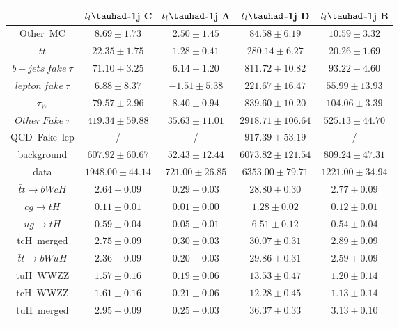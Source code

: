 \centering
\begin{tabular}{ccccc} \toprule\toprule
 & $t_{l}\tauhad$-1j C & $t_{l}\tauhad$-1j A & $t_{l}\tauhad$-1j D & $t_{l}\tauhad$-1j B\\\midrule
Other~MC & $8.69\pm1.73$ & $2.50\pm1.45$ & $84.58\pm6.19$ & $10.59\pm3.32$\\
$t\bar{t}$ & $22.35\pm1.75$ & $1.28\pm0.41$ & $280.14\pm6.27$ & $20.26\pm1.69$\\
$b-jets~fake~\tau$ & $71.10\pm3.25$ & $6.14\pm1.20$ & $811.72\pm10.82$ & $93.22\pm4.60$\\
$lepton~fake~\tau$ & $6.88\pm8.37$ & $-1.51\pm5.38$ & $221.67\pm16.47$ & $55.99\pm13.93$\\
$\tau_{W}$ & $79.57\pm2.96$ & $8.40\pm0.94$ & $839.60\pm10.20$ & $104.06\pm3.39$\\
$Other~Fake~\tau$ & $419.34\pm59.88$ & $35.63\pm11.01$ & $2918.71\pm106.64$ & $525.13\pm44.70$\\
QCD~Fake~lep &  / &  / & $917.39\pm53.19$ &  /\\
background & $607.92\pm60.67$ & $52.43\pm12.44$ & $6073.82\pm121.54$ & $809.24\pm47.31$\\
data & $1948.00\pm44.14$ & $721.00\pm26.85$ & $6353.00\pm79.71$ & $1221.00\pm34.94$\\
$\bar{t}t\to bWcH$ & $2.64\pm0.09$ & $0.29\pm0.03$ & $28.80\pm0.30$ & $2.77\pm0.09$\\
$cg\to tH$ & $0.11\pm0.01$ & $0.01\pm0.00$ & $1.28\pm0.02$ & $0.12\pm0.01$\\
$ug\to tH$ & $0.59\pm0.04$ & $0.05\pm0.01$ & $6.51\pm0.12$ & $0.54\pm0.04$\\
tcH~merged & $2.75\pm0.09$ & $0.30\pm0.03$ & $30.07\pm0.31$ & $2.89\pm0.09$\\
$\bar{t}t\to bWuH$ & $2.36\pm0.09$ & $0.20\pm0.03$ & $29.86\pm0.31$ & $2.59\pm0.09$\\
tuH~WWZZ & $1.57\pm0.16$ & $0.19\pm0.06$ & $13.53\pm0.47$ & $1.20\pm0.14$\\
tcH~WWZZ & $1.61\pm0.16$ & $0.21\pm0.06$ & $12.28\pm0.45$ & $1.13\pm0.14$\\
tuH~merged & $2.95\pm0.09$ & $0.25\pm0.03$ & $36.37\pm0.33$ & $3.13\pm0.10$\\
\bottomrule\bottomrule\\
\end{tabular}
